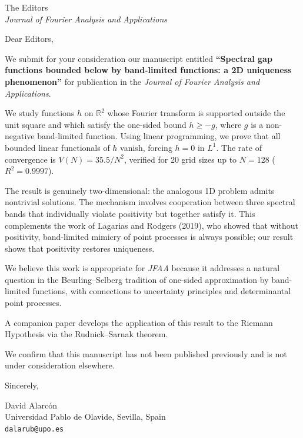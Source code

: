 \documentclass[11pt]{letter}
\begin{document}
\begin{letter}{The Editors \\ \textit{Journal of Fourier Analysis and Applications}}

\opening{Dear Editors,}

We submit for your consideration our manuscript entitled
\textbf{``Spectral gap functions bounded below by band-limited functions:
a 2D uniqueness phenomenon''}
for publication in the \textit{Journal of Fourier Analysis and Applications}.

We study functions $h$ on $\mathbb{R}^2$ whose Fourier transform is
supported outside the unit square and which satisfy the one-sided bound
$h \geq -g$, where $g$ is a non-negative band-limited function. Using
linear programming, we prove that all bounded linear functionals of $h$
vanish, forcing $h = 0$ in $L^1$. The rate of convergence is
$V(N) = 35.5/N^2$, verified for 20 grid sizes up to $N = 128$
($R^2 = 0.9997$).

The result is genuinely two-dimensional: the analogous 1D problem admits
nontrivial solutions. The mechanism involves cooperation between three
spectral bands that individually violate positivity but together satisfy
it. This complements the work of Lagarias and Rodgers (2019), who showed
that without positivity, band-limited mimicry of point processes is
always possible; our result shows that positivity restores uniqueness.

We believe this work is appropriate for \textit{JFAA} because it
addresses a natural question in the Beurling--Selberg tradition of
one-sided approximation by band-limited functions, with connections to
uncertainty principles and determinantal point processes.

A companion paper develops the application of this result to the
Riemann Hypothesis via the Rudnick--Sarnak theorem.

We confirm that this manuscript has not been published previously and is
not under consideration elsewhere.

\closing{Sincerely,}

David Alarc\'on\\
Universidad Pablo de Olavide, Sevilla, Spain\\
\texttt{dalarub@upo.es}

\end{letter}
\end{document}
